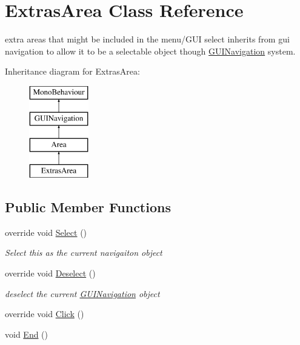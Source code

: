 \hypertarget{class_extras_area}{}\section{Extras\+Area Class Reference}
\label{class_extras_area}


extra areas that might be included in the menu/\+G\+UI select inherits from gui navigation to allow it to be a selectable object though \mbox{\hyperlink{class_g_u_i_navigation}{G\+U\+I\+Navigation}} system.  


Inheritance diagram for Extras\+Area\+:\begin{figure}[H]
\begin{center}
\leavevmode
\includegraphics[height=4.000000cm]{class_extras_area}
\end{center}
\end{figure}
\subsection*{Public Member Functions}
\begin{DoxyCompactItemize}
\item 
override void \mbox{\hyperlink{class_extras_area_a84802701ddb9dd90a6121aee3f96d940}{Select}} ()
\begin{DoxyCompactList}\small\item\em Select this as the current navigaiton object \end{DoxyCompactList}\item 
override void \mbox{\hyperlink{class_extras_area_adebb4c62e12d4a0fa6c89fa28a30b775}{Deselect}} ()
\begin{DoxyCompactList}\small\item\em deselect the current \mbox{\hyperlink{class_g_u_i_navigation}{G\+U\+I\+Navigation}} object \end{DoxyCompactList}\item 
override void \mbox{\hyperlink{class_extras_area_a7bb3d45f3aa655ba946eab4b0c7f38f4}{Click}} ()
\item 
void \mbox{\hyperlink{class_extras_area_a25815ca0b4cd7c1ee7f202e510434298}{End}} ()
\end{DoxyCompactItemize}
